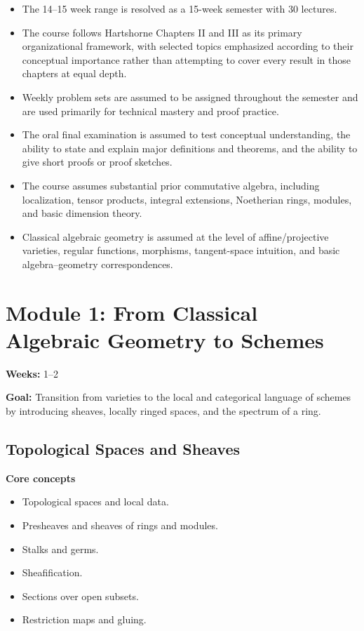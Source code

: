 \documentclass[11pt]{article}
\begin{document}
\begin{itemize}
    \item The 14--15 week range is resolved as a 15-week semester with 30 lectures.
    \item The course follows Hartshorne Chapters II and III as its primary organizational framework, with selected topics emphasized according to their conceptual importance rather than attempting to cover every result in those chapters at equal depth.
    \item Weekly problem sets are assumed to be assigned throughout the semester and are used primarily for technical mastery and proof practice.
    \item The oral final examination is assumed to test conceptual understanding, the ability to state and explain major definitions and theorems, and the ability to give short proofs or proof sketches.
    \item The course assumes substantial prior commutative algebra, including localization, tensor products, integral extensions, Noetherian rings, modules, and basic dimension theory.
    \item Classical algebraic geometry is assumed at the level of affine/projective varieties, regular functions, morphisms, tangent-space intuition, and basic algebra--geometry correspondences.
\end{itemize}

\section{Module 1: From Classical Algebraic Geometry to Schemes}

\textbf{Weeks:} 1--2

\textbf{Goal:} Transition from varieties to the local and categorical language of schemes by introducing sheaves, locally ringed spaces, and the spectrum of a ring.

\subsection{Topological Spaces and Sheaves}

\textbf{Core concepts}
\begin{itemize}
    \item Topological spaces and local data.
    \item Presheaves and sheaves of rings and modules.
    \item Stalks and germs.
    \item Sheafification.
    \item Sections over open subsets.
    \item Restriction maps and gluing.
\end{itemize}
\end{document}
